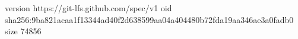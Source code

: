 version https://git-lfs.github.com/spec/v1
oid sha256:9ba821acaa1f13344ad40f2d638599aa04a404480b72fda19aa346ae3a0fadb0
size 74856
